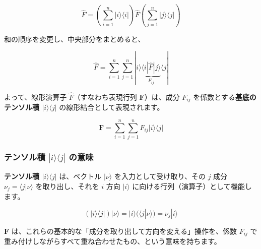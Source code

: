 \documentclass{ltjsarticle}
\begin{document}
$$
\hat{F} = \left( \sum_{i=1}^{n} |i\rangle \langle i| \right) \hat{F} \left( \sum_{j=1}^{n} |j\rangle \langle j| \right)
$$

和の順序を変更し、中央部分をまとめると、

$$
\hat{F} = \sum_{i=1}^{n} \sum_{j=1}^{n} |i\rangle \underbrace{\langle i|\hat{F}|j\rangle}_{F_{ij}} \langle j|
$$

よって、線形演算子 $\hat{F}$（すなわち表現行列 $\mathbf{F}$）は、成分 $F_{ij}$ を係数とする\textbf{基底のテンソル積 $|i\rangle \langle j|$} の線形結合として表現されます。

$$
\mathbf{F} = \sum_{i=1}^{n} \sum_{j=1}^{n} F_{ij} |i\rangle \langle j|
$$

\subsubsection*{テンソル積 $|i\rangle \langle j|$ の意味}

\textbf{テンソル積 $|i\rangle \langle j|$} は、ベクトル $|\nu\rangle$ を入力として受け取り、その $j$ 成分 $\nu_j = \langle j|\nu\rangle$ を取り出し、それを $i$ 方向 $|i\rangle$ に向ける行列（演算子）として機能します。

$$
(|i\rangle \langle j|)|\nu\rangle = |i\rangle (\langle j|\nu\rangle) = \nu_j |i\rangle
$$

$\mathbf{F}$ は、これらの基本的な「成分を取り出して方向を変える」操作を、係数 $F_{ij}$ で重み付けしながらすべて重ね合わせたもの、という意味を持ちます。
\end{document}
